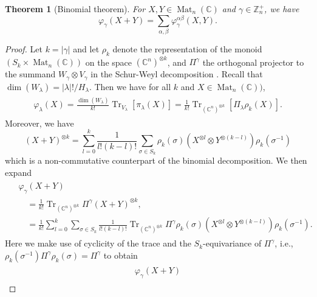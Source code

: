 \documentclass[pdflatex, sn-mathphys-num]{sn-jnl} %
\theoremstyle{plain}
\newtheorem{thm}{Theorem}%
\theoremstyle{definition}
\let\cref\crtcref
\DeclareMathOperator{\Tr}{Tr}
\DeclareMathOperator{\Mat}{Mat}
\newcommand{\undomweightsp}[1]{\mathbb Z^{+}_{#1}}
\newcommand{\ot}{\otimes} %
\newcommand{\vp}{\varphi} %
\newcommand{\ya}{\alpha}
\newcommand{\yb}{\beta}
\newcommand{\yc}{\gamma}
\newcommand{\yx}{\lambda}
\newcommand{\syc}{|\yc|}
\newcommand{\syx}{|\yx|}
\begin{document}
\begin{thm}[Binomial theorem]
    \label{thm:the_binomial_theorem}
    For $X,Y \in \Mat_n(\mathbb{C})$ and $\yc \in \undomweightsp{n}$, we have
    \begin{equation}
        \label{eq:varphi_sum_sum}
        \vp_\yc(X+Y)=\sum_{\ya, \yb} \vp^{\ya \yb}_\yc(X, Y).
    \end{equation}
\end{thm}
\begin{proof}
    Let $k=\syc$ and let $\rho_k$ denote the representation of the monoid $(S_k \times \Mat_n(\mathbb{C}))$ on the space $(\mathbb{C}^n)^{\ot k}$, and $\Pi^\yc$ the orthogonal projector to the summand $W_\yc \ot V_\yc$ in the Schur-Weyl decomposition \cref{eq:schur-weyl}.
    Recall that $\dim(W_{\yx}) = \syx! / H_{\yx}$.
    Then we have for all $k$ and $X \in \Mat_n(\mathbb{C}))$,
    \begin{align}
        \begin{split}
            \vp_{\yx}(X)
            = \frac{\dim(W_{\yx})}{k!} \Tr_{V_\yx}[\pi_\yx(X)]
            = \frac{1}{k!} \Tr_{(\mathbb{C}^n)^{\ot k}}[\Pi_{\yx} \rho_{k}(X)].
        \end{split}
    \end{align}
    Moreover, we have
    \begin{equation}
        (X+Y)^{\ot k} = \sum_{l=0}^k \frac{1}{l!(k-l)!}\sum_{\sigma \in S_k} \rho_k(\sigma) (X^{\ot l} \ot Y^{\ot (k-l)})\rho_k(\sigma^{-1})
    \end{equation}
    which is a non-commutative counterpart of the binomial decomposition.
    We then expand
    \begin{align}
        \begin{split}
            &\vp_\yc(X+Y) \\
            &\quad= \frac{1}{k!} \Tr_{(\mathbb{C}^n)^{\ot k}} \Pi^\yc  (X+Y)^{\ot k}, \\
            &\quad= \frac{1}{k!}\sum_{l=0}^k \sum_{\sigma \in S_k} \frac{1}{l! (k-l)!} \Tr_{(\mathbb{C}^n)^{\ot k}} \Pi^\yc \rho_k(\sigma) (X^{\ot l} \ot Y^{\ot (k-l)})\rho_k(\sigma^{-1}).
        \end{split}
    \end{align}
    Here we make use of cyclicity of the trace and the $S_k$-equivariance of $\Pi^{\yc}$, i.e., $\rho_k(\sigma^{-1}) \Pi^\yc \rho_k(\sigma) = \Pi^\yc$ to obtain
    \begin{align}
        \begin{split}
            \vp_\yc(X+Y)

\end{split}
\end{align}
\end{proof}
\end{document}
